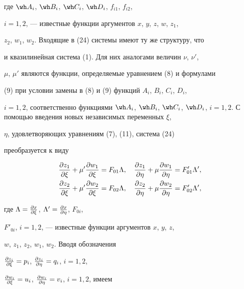 где $\wh A_i$, $\wh B_i$, $\wh C_i$, $\wh D_i$, $f_{i1}$, $f_{i2}$, 


$i=1,2$, --- известные функции аргументов $x$, $y$, $z$, $w$, $z_1$, 


$z_2$, $w_1$, $w_2$. Входящие в (24) системы имеют ту же структуру, что 


и квазилинейная система (1). Для них аналогами величин $\nu$, $\nu'$, 


$\mu$, $\mu'$ являются функции, определяемые уравнением (8) и формулами 


(9) при условии замены в (8) и (9) функций $A_i$, $B_i$, $C_i$, $D_i$, 


$i=1,2$, соответственно функциями $\wh A_i$, $\wh B_i$, $\wh C_i$, $\wh 


D_i$, $i=1,2$. С помощью введения новых независимых переменных $\xi$, 


$\eta$, удовлетворяющих уравнениям (7), (11), система (24) 


преобразуется к виду 


\begin{equation} 


\begin{split} 


\myfrac{z_1}{\xi}+\mu'\myfrac{w_1}{\xi}&=F_{01}\Lambda,\quad 


\myfrac{z_1}{\eta}+\mu\myfrac{w_1}{\eta}=F'_{01}\Lambda',\\ 


% 


\myfrac{z_2}{\xi}+\mu'\myfrac{w_2}{\xi}&=F_{02}\Lambda,\quad 


\myfrac{z_2}{\eta}+\mu\myfrac{w_2}{\eta}=F'_{02}\Lambda', 


\end{split} 


\end{equation} 


где $\Lambda=\frac{\partial x}{\partial \xi}$, $\Lambda'=\frac{\partial x}{\partial \eta}$, $F_{0i}$, 


$F'_{0i}$, $i=1,2$, --- известные функции аргументов $x$, $y$, $z$, 


$w$, $z_1$, $z_2$, $w_1$, $w_2$. Вводя обозначения 


$\frac{\partial z_i}{\partial \xi}=p_i$, $\frac{\partial z_i}{\partial \eta}=q_i$, $i=1,2$, 


$\frac{\partial w_i}{\partial \xi}=u_i$, $\frac{\partial w_i}{\partial \eta}=v_i$, $i=1,2$, имеем 


